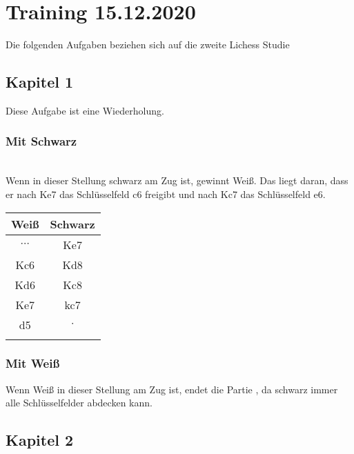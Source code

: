 \chapter{Training 15.12.2020}
 Die folgenden Aufgaben beziehen sich auf die zweite Lichess Studie \cite{Study2}

\section{Kapitel 1}
\links
Diese Aufgabe ist eine Wiederholung. \\

\subsection{Mit Schwarz}
\\

\links
Wenn in dieser Stellung schwarz am Zug ist, gewinnt Weiß. Das liegt daran, dass er nach Ke7 das Schlüsselfeld c6 freigibt und nach Kc7 das Schlüsselfeld e6. \\
\centering
\begin{tabular}[h]{c|c}
	\textbf{Weiß}  & \textbf{Schwarz} \\
	\hline
	$\cdots$ & Ke7 \\
	Kc6 & Kd8 \\
	Kd6 & Kc8 \\
	Ke7 & kc7 \\
	d5 & $\cdot$ \\
	\unterstreichen{1-0}
\end{tabular}

\subsection{Mit Weiß }

Wenn Weiß in dieser Stellung am Zug ist, endet die Partie , da schwarz immer alle Schlüsselfelder abdecken kann.

\section{Kapitel 2}
\\
\links

